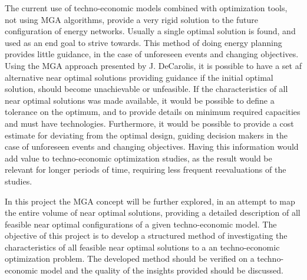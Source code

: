 The current use of techno-economic models combined with optimization tools, not using MGA algorithms, provide a very rigid solution to the future configuration of energy networks. Usually a single optimal solution is found, and used as an end goal to strive towards. This method of doing energy planning provides little guidance, in the case of unforeseen events and changing objectives. Using the MGA approach presented by J. DeCarolis, it is possible to have a set af alternative near optimal solutions providing guidance if the initial optimal solution, should become unachievable or unfeasible. If the characteristics of all near optimal solutions was made available, it would be possible to define a tolerance on the optimum, and to provide details on minimum required capacities and must have technologies. Furthermore, it would be possible to provide a cost estimate for deviating from the optimal design, guiding decision makers in the case of unforeseen events and changing objectives. Having this information would add value to techno-economic optimization studies, as the result would be relevant for longer periods of time, requiring less frequent reevaluations of the studies. 


In this project the MGA concept will be further explored, in an attempt to map the entire volume of near optimal solutions, providing a detailed description of all feasible near optimal configurations of a given techno-economic model. The objective of this project is to develop a structured method of investigating the characteristics of all feasible near optimal solutions to a an techno-economic optimization problem. The developed method should be verified on a techno-economic model and the quality of the insights provided should be discussed. 



